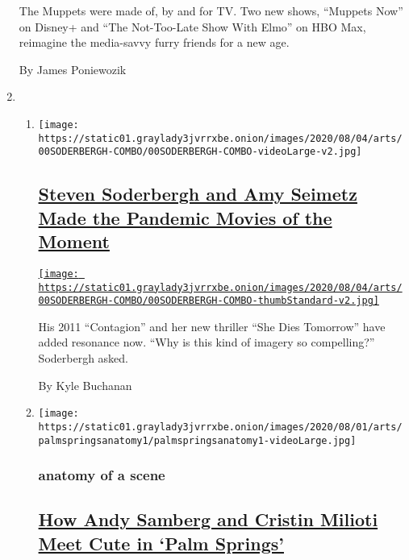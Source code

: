 \begin{enumerate}
  The Muppets were made of, by and for TV. Two new shows, ``Muppets
  Now'' on Disney+ and ``The Not-Too-Late Show With Elmo'' on HBO Max,
  reimagine the media-savvy furry friends for a new age.

  By James Poniewozik
\item
  \begin{enumerate}
  \def\labelenumii{\arabic{enumii}.}
  \item
    \texttt{[image: https://static01.graylady3jvrrxbe.onion/images/2020/08/04/arts/00SODERBERGH-COMBO/00SODERBERGH-COMBO-videoLarge-v2.jpg]}

    \hypertarget{steven-soderbergh-and-amy-seimetz-made-the-pandemic-movies-of-the-moment}{%
    \subsection{\texorpdfstring{\href{/2020/07/31/movies/steven-soderbergh-amy-seimetz-pandemic.html}{Steven
    Soderbergh and Amy Seimetz Made the Pandemic Movies of the
    Moment}}{Steven Soderbergh and Amy Seimetz Made the Pandemic Movies of the Moment}}\label{steven-soderbergh-and-amy-seimetz-made-the-pandemic-movies-of-the-moment}}

    \href{/2020/07/31/movies/steven-soderbergh-amy-seimetz-pandemic.html}{\texttt{[image: https://static01.graylady3jvrrxbe.onion/images/2020/08/04/arts/00SODERBERGH-COMBO/00SODERBERGH-COMBO-thumbStandard-v2.jpg]}}

    His 2011 ``Contagion'' and her new thriller ``She Dies Tomorrow''
    have added resonance now. ``Why is this kind of imagery so
    compelling?'' Soderbergh asked.

    By Kyle Buchanan
  \item
    \texttt{[image: https://static01.graylady3jvrrxbe.onion/images/2020/08/01/arts/palmspringsanatomy1/palmspringsanatomy1-videoLarge.jpg]}

    \hypertarget{anatomy-of-a-scene}{%
    \subsubsection{anatomy of a scene}\label{anatomy-of-a-scene}}

    \hypertarget{how-andy-samberg-and-cristin-milioti-meet-cute-in-palm-springs}{%
    \subsection{\texorpdfstring{\href{/2020/07/31/movies/palm-springs-clip-hulu.html}{How
    Andy Samberg and Cristin Milioti Meet Cute in `Palm
    Springs'}}{How Andy Samberg and Cristin Milioti Meet Cute in `Palm Springs'}}\label{how-andy-samberg-and-cristin-milioti-meet-cute-in-palm-springs}}


\end{enumerate}
\end{enumerate}

